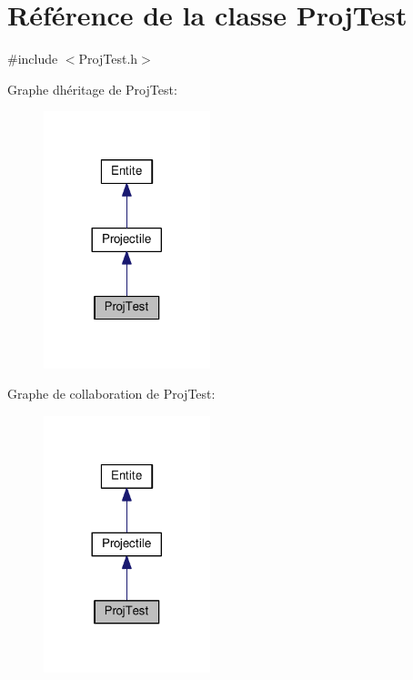 \hypertarget{class_proj_test}{}\section{Référence de la classe Proj\+Test}
\label{class_proj_test}


{\ttfamily \#include $<$Proj\+Test.\+h$>$}



Graphe d\textquotesingle{}héritage de Proj\+Test\+:\nopagebreak
\begin{figure}[H]
\begin{center}
\leavevmode
\includegraphics[width=137pt]{class_proj_test__inherit__graph}
\end{center}
\end{figure}


Graphe de collaboration de Proj\+Test\+:\nopagebreak
\begin{figure}[H]
\begin{center}
\leavevmode
\includegraphics[width=137pt]{class_proj_test__coll__graph}
\end{center}
\end{figure}
